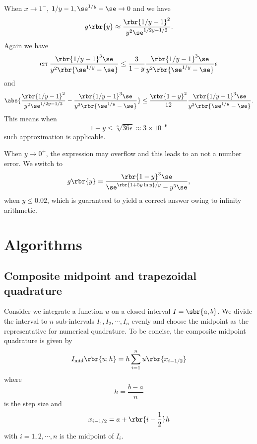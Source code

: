 \documentclass[english, nochinese]{pnote}
\DeclareMathOperator{\operr}{\mathrm{err}}
\begin{document}
When $ x \rightarrow 1^{-} $, $ 1 / y - 1, \se^{ 1 / y } - \se \rightarrow 0 $ and we have
\begin{equation}
g \rbr{y} \approx \frac{\rbr{ 1 / y - 1 }^2}{ y^2 \se^{ 1 / 2 y - 1 / 2 } }.
\end{equation}
Again we have
\begin{equation}
\operr \frac{ \rbr{ 1 / y - 1 }^3 \se }{ y^2 \rbr{ \se^{ 1 / y } - \se } } \le \frac{3}{ 1 - y } \frac{ \rbr{ 1 / y - 1 }^3 \se }{ y^2 \rbr{ \se^{ 1 / y } - \se } } \epsilon
\end{equation}
and
\begin{equation}
\abs{ \frac{\rbr{ 1 / y - 1 }^2}{ y^2 \se^{ 1 / 2 y - 1 / 2 } } - \frac{ \rbr{ 1 / y - 1 }^3 \se }{ y^2 \rbr{ \se^{ 1 / y } - \se } } } \le \frac{\rbr{ 1 - y }^2}{12} \frac{ \rbr{ 1 / y - 1 }^3 \se }{ y^2 \rbr{ \se^{ 1 / y } - \se } }.
\end{equation}
This means when
\begin{equation}
1 - y \le \sqrt[3]{ 36 \epsilon } \approx 3 \times 10^{-6}
\end{equation}
such approximation is applicable.

When $ y \rightarrow 0^+ $, the expression may overflow and this leads to an not a number error. We switch to
\begin{equation}
g \rbr{y} = \frac{ \rbr{ 1 - y }^3 \se }{ \se^{ \rbr{ 1 + 5 y \ln y } / y } - y^5 \se },
\end{equation}
when $ y \le 0.02 $, which is guaranteed to yield a correct answer owing to infinity arithmetic.

\section{Algorithms}

\subsection{Composite midpoint and trapezoidal quadrature}

Consider we integrate a function $u$ on a closed interval $ I = \sbr{ a, b } $. We divide the interval to $n$ sub-intervals $ I_1, I_2, \cdots, I_n $ evenly and choose the midpoint as the representative for numerical quadrature. To be concise, the composite midpoint quadrature is given by
\begin{equation}
I_{\text{mid}} \rbr{ u; h } = h \sum_{ i = 1 }^n u \rbr{x_{ i - 1 / 2 }}
\end{equation}
where
\begin{equation}
h = \frac{ b - a }{n}
\end{equation}
is the step size and
\begin{equation}
x_{ i - 1 / 2 } = a + \rbr{ i - \frac{1}{2} } h
\end{equation}
with $ i = 1, 2, \cdots, n $ is the midpoint of $I_i$.
\end{document}
